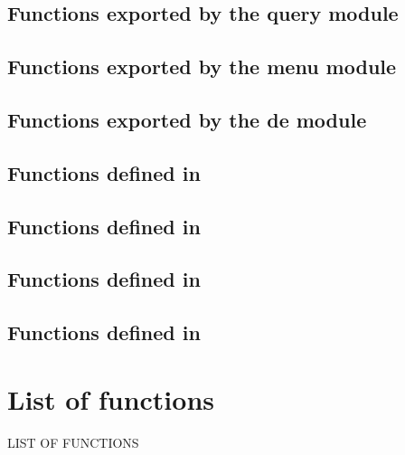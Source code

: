 \documentclass[english,a4paper,11pt,oldtoc,mctitle]{rapport3}
\begin{document}


\section{Functions exported by the query module}
\label{sec:queryref}



\section{Functions exported by the menu module}
\label{sec:menuref}



\section{Functions exported by the de module}
\label{sec:menuref}





\section{Functions defined in }
\label{sec:ioncorelibref}



\section{Functions defined in }
\label{sec:querylibref}



\section{Functions defined in }
\label{sec:delibref}



\section{Functions defined in }
\label{sec:menulibref}



\appendix



\chapter*{List of functions}
%
         {\MakeUppercase{List of functions}}%

\makeatletter
\def\fnlisti#1{\@dottedtocline{1}{0em}{1.5em}{\lstinline!#1!}{\pageref{fn:#1}}}
{\parskip\z@}
\makeatother

\begin{htmlonly}
\newcommand{\fnlisti}[1]{\fnref{#1}\\}

\end{htmlonly}


\printindex
\end{document}
